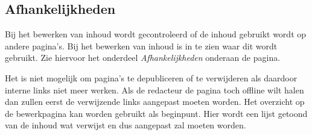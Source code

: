 \subsection{Afhankelijkheden}
Bij het bewerken van inhoud wordt gecontroleerd of de inhoud gebruikt wordt op andere pagina's. Bij het bewerken van inhoud is in te zien waar dit wordt gebruikt. Zie hiervoor het onderdeel \emph{Afhankelijkheden} onderaan de pagina.

Het is niet mogelijk om pagina's te depubliceren of te verwijderen als daardoor interne links niet meer werken. Als de redacteur de pagina toch offline wilt halen dan zullen eerst de verwijzende links aangepast moeten worden. Het overzicht op de bewerkpagina kan worden gebruikt als beginpunt. Hier wordt een lijst getoond van de inhoud wat verwijst en dus aangepast zal moeten worden.

